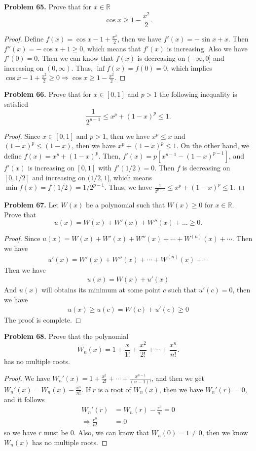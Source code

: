 \documentclass[12pt,leqno]{amsart}
\begin{document}
\medskip


\noindent
{\bf Problem 65.}
Prove that for $x\in\mathbb{R}$
$$
\cos x\geq 1-\frac{x^2}{2}.
$$
\begin{proof}
Define $f(x)=\cos x-1+\frac{x^2}{2}$, then we have $f'(x)=-\sin x+x$. Then $f''(x)=-\cos x +1\geq 0$, which means that $f'(x)$ is increasing. Also we have $f'(0)=0$. Then we can know that $f(x)$ is decreasing on $(-\infty,0]$ and increasing on $(0,\infty)$. Thus, $\inf f(x)=f(0)=0$, which implies $\cos x-1+\frac{x^2}{2}\geq 0 \Rightarrow \cos x\geq 1-\frac{x^2}{2}$.
\end{proof}

\medskip


\noindent
{\bf Problem 66.}
Prove that for $x\in [0,1]$ and $p>1$ the following inequality is satisfied
$$
\frac{1}{2^{p-1}}\leq x^p + (1-x)^p\leq 1.
$$
\begin{proof}
Since $x\in[0,1]$ and $p>1$, then we have $x^p\leq x$ and $(1-x)^p\leq (1-x)$, then we have $x^p + (1-x)^p\leq 1$. On the other hand, we define $f(x)=x^p + (1-x)^p$. Then, $f'(x)=p[x^{p-1}-(1-x)^{p-1}]$, and $f'(x)$ is increasing on $[0,1]$ with $f'(1/2)=0$. Then $f$ is decreasing on $[0,1/2]$ and increasing on $(1/2,1]$, which means $\min f(x)=f(1/2)=1/2^{p-1}$. Thus, we have $\frac{1}{2^{p-1}}\leq x^p + (1-x)^p\leq 1$.
\end{proof}

\medskip


\noindent
{\bf Problem 67.}
Let $W(x)$ be a polynomial such that $W(x)\geq 0$ for $x\in\mathbb{R}$. Prove that
$$
u(x) = W(x) + W'(x) + W''(x)+\ldots\geq 0.
$$
\begin{proof}
Since $u(x)=W(x) + W'(x) + W''(x)+ \cdots +W^{(n)}(x) + \cdots$. Then we have
\begin{align*}
    u'(x) = W'(x) + W''(x)+ \cdots +W^{(n)}(x) + \cdots
\end{align*}
Then we have 
\begin{align*}
    u(x)=W(x)+u'(x)
\end{align*}
And $u(x)$ will obtains its minimum at some point $c$ such that $u'(c)=0$, then we have 
\begin{align*}
    u(x)\geq u(c)=W(c)+u'(c)\geq 0
\end{align*}
The proof is complete.
\end{proof}

\medskip

\noindent
{\bf Problem 68.}
Prove that the polynomial
$$
W_n(x) = 1+\frac{x}{1!} + \frac{x^2}{2!} + \cdots + \frac{x^n}{n!}.
$$
has no multiple roots.
\begin{proof}
We have $W_n'(x)=1+\frac{x^2}{2!}+\cdots+\frac{x^{n-1}}{(n-1)!}$, and then we get $W_n'(x)=W_n(x)-\frac{x^n}{n!}$. If $r$ is a root of $W_n(x)$, then we have $W_n'(r)=0$, and it follows 
\begin{align*}
    W_n'(r) & =W_n(r)-\frac{r^n}{n!} = 0\\
    \Rightarrow \frac{r^n}{n!} & = 0
\end{align*}
so we have $r$ must be $0$. Also, we can know that $W_n(0)=1\neq 0$, then we know $W_n(x)$ has no multiple roots.
\end{proof}
\end{document}
